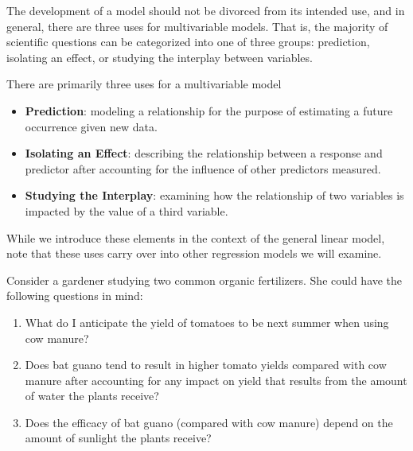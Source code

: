 \documentclass[
  letterpaper,
  DIV=11,
  numbers=noendperiod]{scrreprt}
\providecommand{\tightlist}{%
  \setlength{\itemsep}{0pt}\setlength{\parskip}{0pt}}\usepackage{longtable,booktabs,array}
\theoremstyle{definition}
\theoremstyle{definition}
\theoremstyle{remark}
\begin{document}
The development of a model should not be divorced from its intended use,
and in general, there are three uses for multivariable models. That is,
the majority of scientific questions can be categorized into one of
three groups: prediction, isolating an effect, or studying the interplay
between variables.

\begin{tcolorbox}[enhanced jigsaw, bottomrule=.15mm, titlerule=0mm, bottomtitle=1mm, colback=white, coltitle=black, rightrule=.15mm, leftrule=.75mm, toprule=.15mm, toptitle=1mm, left=2mm, opacityback=0, colframe=quarto-callout-tip-color-frame, breakable, title=\textcolor{quarto-callout-tip-color}{\faLightbulb}\hspace{0.5em}{Big Idea}, arc=.35mm, colbacktitle=quarto-callout-tip-color!10!white, opacitybacktitle=0.6]

There are primarily three uses for a multivariable model

\begin{itemize}
\tightlist
\item
  \textbf{Prediction}: modeling a relationship for the purpose of
  estimating a future occurrence given new data.
\item
  \textbf{Isolating an Effect}: describing the relationship between a
  response and predictor after accounting for the influence of other
  predictors measured.
\item
  \textbf{Studying the Interplay}: examining how the relationship of two
  variables is impacted by the value of a third variable.
\end{itemize}

\end{tcolorbox}

While we introduce these elements in the context of the general linear
model, note that these uses carry over into other regression models we
will examine.

Consider a gardener studying two common organic fertilizers. She could
have the following questions in mind:

\begin{enumerate}
\def\labelenumi{\Alph{enumi}.}
\tightlist
\item
  What do I anticipate the yield of tomatoes to be next summer when
  using cow manure?
\item
  Does bat guano tend to result in higher tomato yields compared with
  cow manure after accounting for any impact on yield that results from
  the amount of water the plants receive?
\item
  Does the efficacy of bat guano (compared with cow manure) depend on
  the amount of sunlight the plants receive?
\end{enumerate}
\end{document}
